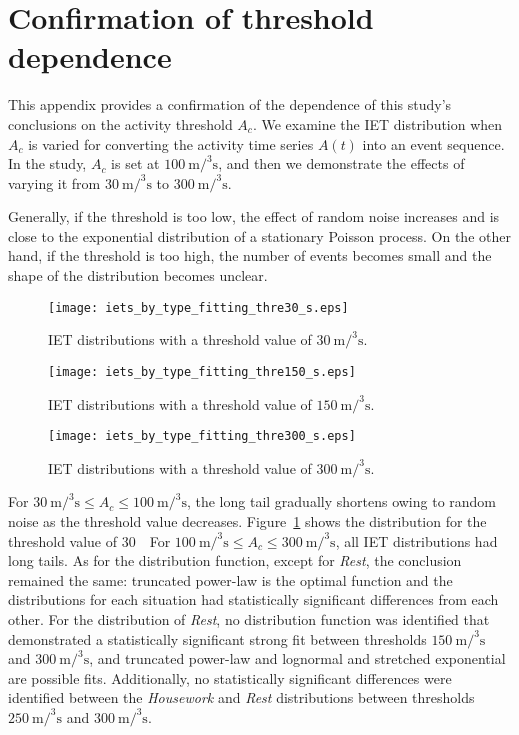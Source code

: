 \documentclass{bmcart}
\begin{document}
\section{Confirmation of threshold dependence}
\label{sec:appendix_a}
This appendix provides a confirmation of the dependence of this study's conclusions on the activity threshold $A_c$. We examine the IET distribution when $A_c$ is varied for converting the activity time series $A(t)$ into an event sequence. In the study, $A_c$ is set at $100~\si{\metre\cubic\per\second}$, and then we demonstrate the effects of varying it from $30~\si{\metre\cubic\per\second}$ to $300~\si{\metre\cubic\per\second}$.

Generally, if the threshold is too low, the effect of random noise increases and is close to the exponential distribution of a stationary Poisson process. On the other hand, if the threshold is too high, the number of events becomes small and the shape of the distribution becomes unclear.

\begin{figure}[ht]
\centering
 \texttt{[image: iets\_by\_type\_fitting\_thre30\_s.eps]}
 \caption{IET distributions with a threshold value of $30~\si{\metre\cubic\per\second}$.}
 \label{fig:iets_thre30}
\end{figure}

\begin{figure}[ht]
\centering
 \texttt{[image: iets\_by\_type\_fitting\_thre150\_s.eps]}
 \caption{IET distributions with a threshold value of $150~\si{\metre\cubic\per\second}$.}
 \label{fig:iets_thre150}
\end{figure}

\begin{figure}[ht]
\centering
 \texttt{[image: iets\_by\_type\_fitting\_thre300\_s.eps]}
 \caption{IET distributions with a threshold value of $300~\si{\metre\cubic\per\second}$.}
 \label{fig:iets_thre300}
\end{figure}
For $30~\si{\metre\cubic\per\second} \le A_c \le 100 ~\si{\metre\cubic\per\second}$, the long tail gradually shortens owing to random noise as the threshold value decreases. Figure~\ref{fig:iets_thre30} shows the distribution for the threshold value of 30~\si{\metre\cubic\per\second}.


For $100~\si{\metre\cubic\per\second} \le A_c \le 300 ~\si{\metre\cubic\per\second}$, all IET distributions had long tails.
As for the distribution function, except for \textit{Rest}, the conclusion remained the same: truncated power-law is the optimal function and the distributions for each situation had statistically significant differences from each other. For the distribution of \textit{Rest}, no distribution function was identified that demonstrated a statistically significant strong fit between thresholds $150 ~\si{\metre\cubic\per\second}$ and $300 ~\si{\metre\cubic\per\second}$, and truncated power-law and lognormal and stretched exponential are possible fits. Additionally, no statistically significant differences were identified between the \textit{Housework} and \textit{Rest} distributions between thresholds $250 ~\si{\metre\cubic\per\second}$ and $300 ~\si{\metre\cubic\per\second}$.
\end{document}

